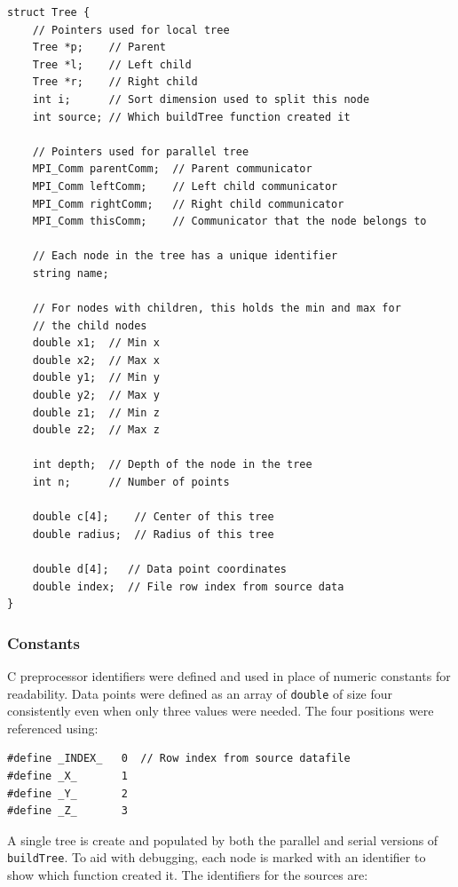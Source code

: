 \documentclass{article}
\begin{document}
\lstset{language=C++, keepspaces=true}
\begin{lstlisting}
struct Tree {
    // Pointers used for local tree
	Tree *p;    // Parent
	Tree *l;    // Left child
	Tree *r;    // Right child
	int i;      // Sort dimension used to split this node
	int source; // Which buildTree function created it

    // Pointers used for parallel tree
	MPI_Comm parentComm;  // Parent communicator
	MPI_Comm leftComm;    // Left child communicator
	MPI_Comm rightComm;   // Right child communicator
	MPI_Comm thisComm;    // Communicator that the node belongs to

    // Each node in the tree has a unique identifier
	string name;

    // For nodes with children, this holds the min and max for
    // the child nodes
	double x1;  // Min x
	double x2;  // Max x
	double y1;  // Min y
	double y2;  // Max y
	double z1;  // Min z
	double z2;  // Max z

	int depth;  // Depth of the node in the tree
	int n;      // Number of points

	double c[4];    // Center of this tree
	double radius;  // Radius of this tree

	double d[4];   // Data point coordinates
	double index;  // File row index from source data
}
\end{lstlisting}

%
%

\subsubsection{Constants}\label{sec:constants}

C preprocessor identifiers were defined and used in place of numeric constants for readability. Data points were defined as an array of \texttt{double} of size four consistently even when only three values were needed. The four positions were referenced using:

\lstset{language=C++, keepspaces=true}
\begin{lstlisting}
#define _INDEX_   0  // Row index from source datafile
#define _X_       1
#define _Y_       2
#define _Z_       3
\end{lstlisting}

A single tree is create and populated by both the parallel and serial versions of \texttt{buildTree}. To aid with debugging, each node is marked with an identifier to show which function created it. The identifiers for the sources are:
\end{document}
